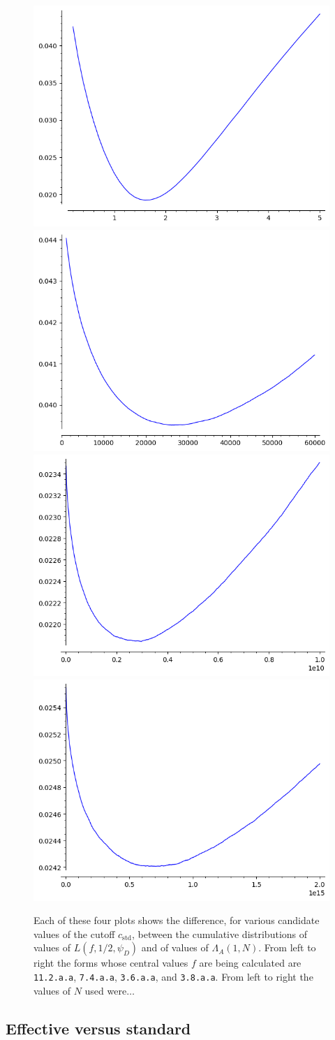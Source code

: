 \documentclass[11pt]{amsart}
\newcommand{\std}{\textrm{std}}
\begin{document}
\begin{figure}
\includegraphics[width=.2\textwidth]{images/c_std-11-2.png}\hfill
\includegraphics[width=.2\textwidth]{images/c_std-7-4.png}\hfill
\includegraphics[width=.2\textwidth]{images/c_std-3-6.png}\hfill
\includegraphics[width=.2\textwidth]{images/c_std-3-8.png}
\caption{Each of these four plots shows the difference, for various candidate values of the cutoff $c_\std$, between the cumulative distributions of values of $L(f,1/2,\psi_D)$ and of values of $\Lambda_A(1,N)$.  From left to right the forms whose central values $f$ are being calculated are \texttt{11.2.a.a}, \texttt{7.4.a.a}, \texttt{3.6.a.a}, and \texttt{3.8.a.a}.  From left to right the values of $N$ used were$\dots$}\label{fig:c_std}
\end{figure}



\subsection{Effective versus standard}









 

\end{document}
